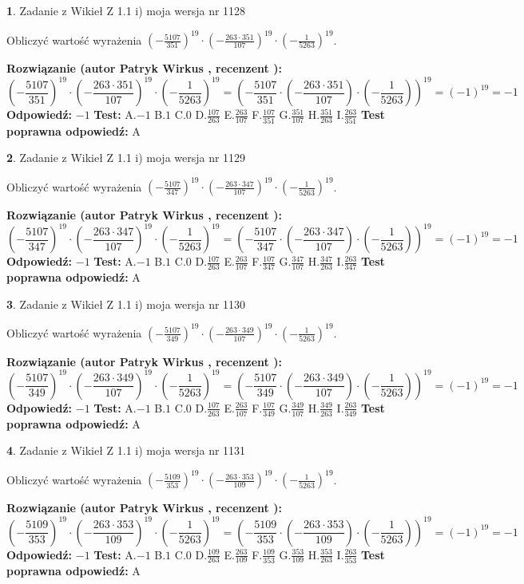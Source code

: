 \documentclass[12pt, a4paper]{article}
\theoremstyle{definition} %
\newtheorem{zad}{}
\newcommand{\zadStart}[1]{\begin{zad}#1\newline}
\newcommand{\zadStop}{\end{zad}}
\newcommand{\rozwStart}[2]{\noindent \textbf{Rozwiązanie (autor #1 , recenzent #2): }\newline}
\newcommand{\rozwStop}{\newline}
\newcommand{\odpStart}{\noindent \textbf{Odpowiedź:}\newline}
\newcommand{\odpStop}{\newline}
\newcommand{\testStart}{\noindent \textbf{Test:}\newline}
\newcommand{\testStop}{\newline}
\newcommand{\kluczStart}{\noindent \textbf{Test poprawna odpowiedź:}\newline}
\newcommand{\kluczStop}{\newline}
\begin{document}
\zadStart{Zadanie z Wikieł Z 1.1 i) moja wersja nr 1128}

Obliczyć wartość wyrażenia $(-\frac{5107}{351})^{19} \cdot (-\frac{263 \cdot 351}{107})^{19} \cdot (-\frac{1}{5263})^{19}$.
\zadStop
\rozwStart{Patryk Wirkus}{}
$$(-\frac{5107}{351})^{19} \cdot (-\frac{263 \cdot 351}{107})^{19} \cdot (-\frac{1}{5263})^{19} = (-\frac{5107}{351} \cdot (-\frac{263 \cdot 351}{107}) \cdot (-\frac{1}{5263}))^{19} = (-1)^{19} = -1$$
\rozwStop
\odpStart
$-1$
\odpStop
\testStart
A.$-1$ B.$1$ C.$0$ D.$\frac{107}{263}$ E.$\frac{263}{107}$
F.$\frac{107}{351}$ G.$\frac{351}{107}$
H.$\frac{351}{263}$
I.$\frac{263}{351}$
\testStop
\kluczStart
A
\kluczStop



\zadStart{Zadanie z Wikieł Z 1.1 i) moja wersja nr 1129}

Obliczyć wartość wyrażenia $(-\frac{5107}{347})^{19} \cdot (-\frac{263 \cdot 347}{107})^{19} \cdot (-\frac{1}{5263})^{19}$.
\zadStop
\rozwStart{Patryk Wirkus}{}
$$(-\frac{5107}{347})^{19} \cdot (-\frac{263 \cdot 347}{107})^{19} \cdot (-\frac{1}{5263})^{19} = (-\frac{5107}{347} \cdot (-\frac{263 \cdot 347}{107}) \cdot (-\frac{1}{5263}))^{19} = (-1)^{19} = -1$$
\rozwStop
\odpStart
$-1$
\odpStop
\testStart
A.$-1$ B.$1$ C.$0$ D.$\frac{107}{263}$ E.$\frac{263}{107}$
F.$\frac{107}{347}$ G.$\frac{347}{107}$
H.$\frac{347}{263}$
I.$\frac{263}{347}$
\testStop
\kluczStart
A
\kluczStop



\zadStart{Zadanie z Wikieł Z 1.1 i) moja wersja nr 1130}

Obliczyć wartość wyrażenia $(-\frac{5107}{349})^{19} \cdot (-\frac{263 \cdot 349}{107})^{19} \cdot (-\frac{1}{5263})^{19}$.
\zadStop
\rozwStart{Patryk Wirkus}{}
$$(-\frac{5107}{349})^{19} \cdot (-\frac{263 \cdot 349}{107})^{19} \cdot (-\frac{1}{5263})^{19} = (-\frac{5107}{349} \cdot (-\frac{263 \cdot 349}{107}) \cdot (-\frac{1}{5263}))^{19} = (-1)^{19} = -1$$
\rozwStop
\odpStart
$-1$
\odpStop
\testStart
A.$-1$ B.$1$ C.$0$ D.$\frac{107}{263}$ E.$\frac{263}{107}$
F.$\frac{107}{349}$ G.$\frac{349}{107}$
H.$\frac{349}{263}$
I.$\frac{263}{349}$
\testStop
\kluczStart
A
\kluczStop



\zadStart{Zadanie z Wikieł Z 1.1 i) moja wersja nr 1131}

Obliczyć wartość wyrażenia $(-\frac{5109}{353})^{19} \cdot (-\frac{263 \cdot 353}{109})^{19} \cdot (-\frac{1}{5263})^{19}$.
\zadStop
\rozwStart{Patryk Wirkus}{}
$$(-\frac{5109}{353})^{19} \cdot (-\frac{263 \cdot 353}{109})^{19} \cdot (-\frac{1}{5263})^{19} = (-\frac{5109}{353} \cdot (-\frac{263 \cdot 353}{109}) \cdot (-\frac{1}{5263}))^{19} = (-1)^{19} = -1$$
\rozwStop
\odpStart
$-1$
\odpStop
\testStart
A.$-1$ B.$1$ C.$0$ D.$\frac{109}{263}$ E.$\frac{263}{109}$
F.$\frac{109}{353}$ G.$\frac{353}{109}$
H.$\frac{353}{263}$
I.$\frac{263}{353}$
\testStop
\kluczStart
A
\kluczStop
\end{document}
